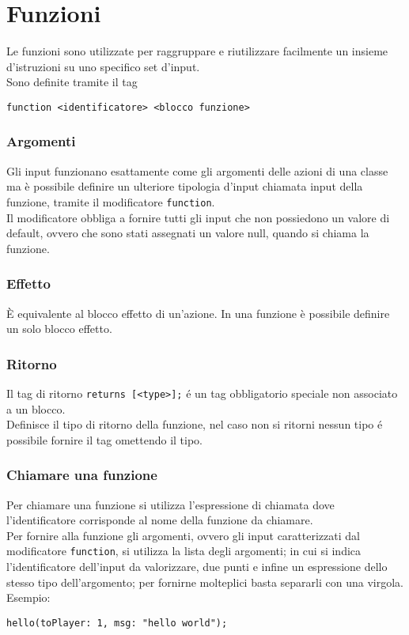 \section{Funzioni}
Le funzioni sono utilizzate per raggruppare e riutilizzare facilmente un insieme d'istruzioni 
su uno specifico set d'input. \\ 
Sono definite tramite il tag 
\begin{lstlisting}
function <identificatore> <blocco funzione>
\end{lstlisting}

\subsubsection{Argomenti} \label{ModificatoreFunction}
Gli input funzionano esattamente come gli argomenti delle azioni di una classe ma è 
possibile definire un ulteriore tipologia d'input chiamata input della funzione,
tramite il modificatore \lstinline|function|. \\
Il modificatore obbliga a fornire tutti gli input che non possiedono un valore di default,
ovvero che sono stati assegnati un valore null, quando si chiama la funzione.

\subsubsection{Effetto}
È equivalente al blocco effetto di un’azione. 
In una funzione è possibile definire un solo blocco effetto.

\subsubsection{Ritorno}
Il tag di ritorno \lstinline|returns [<type>];| é un tag obbligatorio speciale non associato a un blocco. \\
Definisce il tipo di ritorno della funzione, nel caso non si ritorni nessun tipo é possibile 
fornire il tag omettendo il tipo.

\subsubsection{Chiamare una funzione} \label{ChiamataFunzione}
Per chiamare una funzione si utilizza l'espressione di chiamata dove l'identificatore corrisponde al nome
della funzione da chiamare. \\
Per fornire alla funzione gli argomenti, ovvero gli input caratterizzati dal modificatore \lstinline|function|, si 
utilizza la lista degli argomenti; in cui si indica l'identificatore dell'input da valorizzare, due punti e 
infine un espressione dello stesso tipo dell'argomento; per fornirne molteplici basta separarli con una virgola. Esempio:
\begin{lstlisting}
hello(toPlayer: 1, msg: "hello world");
\end{lstlisting}

